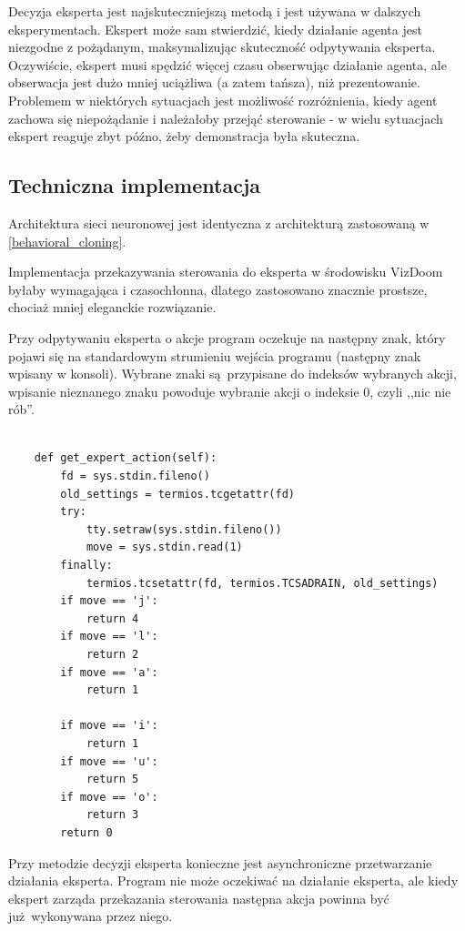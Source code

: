 \documentclass[polish,master,a4paper,oneside]{ppfcmthesis}
\begin{document}
Decyzja eksperta jest najskuteczniejszą metodą i jest używana w dalszych eksperymentach. Ekspert może sam stwierdzić, kiedy działanie agenta jest niezgodne z pożądanym, maksymalizując skuteczność odpytywania eksperta. Oczywiście, ekspert musi spędzić więcej czasu obserwując działanie agenta, ale obserwacja jest dużo mniej uciążliwa (a zatem tańsza), niż prezentowanie. Problemem w niektórych sytuacjach jest możliwość rozróżnienia, kiedy agent zachowa się niepożądanie i należałoby przejąć sterowanie - w wielu sytuacjach ekspert reaguje zbyt późno, żeby demonstracja była skuteczna.

\subsection{Techniczna implementacja}

Architektura sieci neuronowej jest identyczna z architekturą zastosowaną w \ref{behavioral_cloning}.

Implementacja przekazywania sterowania do eksperta w środowisku VizDoom byłaby wymagająca i czasochłonna, dlatego zastosowano znacznie prostsze, chociaż mniej eleganckie rozwiązanie.

Przy odpytywaniu eksperta o akcje program oczekuje na następny znak, który pojawi się na standardowym strumieniu wejścia programu (następny znak wpisany w konsoli). Wybrane znaki są przypisane do indeksów wybranych akcji, wpisanie nieznanego znaku powoduje wybranie akcji o indeksie 0, czyli ,,nic nie rób''.

\begin{lstlisting}[language=iPython]

    def get_expert_action(self):
        fd = sys.stdin.fileno()
        old_settings = termios.tcgetattr(fd)
        try:
            tty.setraw(sys.stdin.fileno())
            move = sys.stdin.read(1)
        finally:
            termios.tcsetattr(fd, termios.TCSADRAIN, old_settings)
        if move == 'j':
            return 4
        if move == 'l':
            return 2
        if move == 'a':
            return 1

        if move == 'i':
            return 1
        if move == 'u':
            return 5
        if move == 'o':
            return 3
        return 0
\end{lstlisting}

Przy metodzie decyzji eksperta konieczne jest asynchroniczne przetwarzanie działania eksperta. Program nie może oczekiwać na działanie eksperta, ale kiedy ekspert zarząda przekazania sterowania następna akcja powinna być już wykonywana przez niego.
\end{document}
